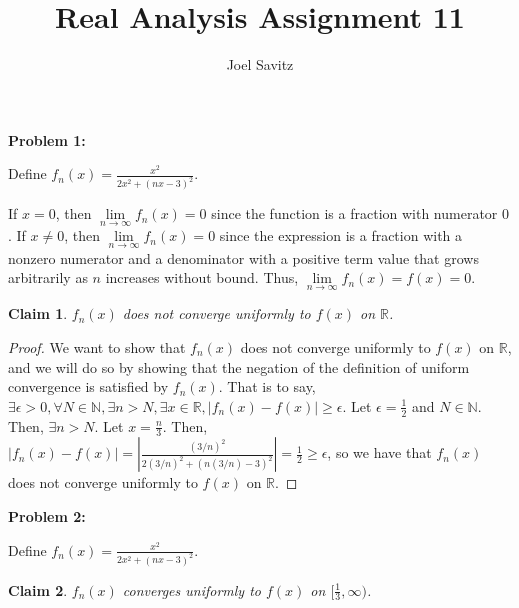 \documentclass{article}
\title{Real Analysis Assignment 11}
\author{Joel Savitz}
\newcommand{\reals}{\ensuremath{\mathbb{R}}}
\newcommand{\nats}{\ensuremath{\mathbb{N}}}
\newcommand{\eps}{\ensuremath{\epsilon}}
\newcommand{\limxy}[2]{\ensuremath{\underset{#1 \to #2 }{\lim}}}
\newtheorem{clm}{Claim}
\begin{document}
\maketitle

\textbf{Problem 1:}

Define $f_n (x) = \frac{x^2}{2x^2 + (nx -3)^2}$.

If $x = 0$, then $\limxy{n}{\infty} f_n (x) = 0$
since the function is a fraction with numerator $0$.
If $x \neq 0$, then $\limxy{n}{\infty} f_n (x) = 0$
since the expression is a fraction with
a nonzero numerator and a  denominator
with a positive term value that grows arbitrarily
as $n$ increases without bound.
Thus, $\limxy{n}{\infty}f_n(x) = f(x) = 0$.

\begin{clm}
	$f_n(x)$ does not converge uniformly to $f(x)$ on $\reals$.
\end{clm}

\begin{proof}
	We want to show that
	$f_n(x)$ does not converge uniformly to $f(x)$ on $\reals$,
	and we will do so by showing that the negation of the definition
	of uniform convergence is satisfied by $f_n(x)$.
	That is to say,
	$\exists \eps > 0,
	\forall N \in \nats,
	\exists n > N, \exists x \in \reals,
	|f_n(x) - f(x)| \geq \eps$.
	Let $\eps = \frac{1}{2}$
	and $N \in \nats$.
	Then, $\exists n > N$.
	Let $x = \frac{n}{3}$.
	Then, $|f_n(x) - f(x)| = |\frac{(3/n)^2}{2(3/n)^2 + (n(3/n) - 3)^2}| = \frac{1}{2} \geq \eps$,
	so we have that $f_n(x)$
	does not converge uniformly
	to $f(x)$ on $\reals$.
\end{proof}

\textbf{Problem 2:}


Define $f_n (x) = \frac{x^2}{2x^2 + (nx -3)^2}$.

\begin{clm}
	$f_n(x)$ converges uniformly to $f(x)$ on $[\frac{1}{3}, \infty)$.
\end{clm}
\end{document}
